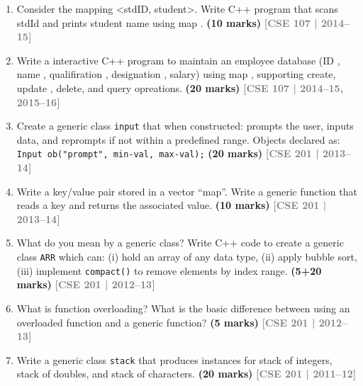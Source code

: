 \documentclass[12pt,a3paper]{article}
\newcommand{\yr}[1]{\hfill\textcolor{gray}{\small\textbf{[#1]}}}
\newcommand{\mk}[1]{\textcolor{orange!70!black}{\small\textbf{(#1 marks)}}}
\begin{document}
\begin{enumerate}
\item Consider the mapping <stdID, student>. Write C++ program that scans stdId and prints student name using map . \mk{10}
\yr{CSE 107 | 2014--15}



\item Write a interactive C++ program to maintain an employee database (ID , name , qualifiration , designation , salary) using map , supporting create, update , delete, and query opreations. \mk{20}
\yr{CSE 107 | 2014--15, 2015--16}




\item Create a generic class \texttt{input} that when constructed: prompts the user, inputs data, and reprompts if not within a predefined range. Objects declared as: \texttt{Input ob("prompt", min-val, max-val);} \mk{20}
\yr{CSE 201 | 2013--14}





\item Write a key/value pair stored in a vector ``map''. Write a generic function that reads a key and returns the associated value. \mk{10}
\yr{CSE 201 | 2013--14}




\item What do you mean by a generic class? Write C++ code to create a generic class \texttt{ARR} which can: (i) hold an array of any data type, (ii) apply bubble sort, (iii) implement \texttt{compact()} to remove elements by index range. \mk{5+20}
\yr{CSE 201 | 2012--13}





\item What is function overloading? What is the basic difference between using an overloaded function and a generic function? \mk{5}
\yr{CSE 201 | 2012--13}




\item Write a generic class \texttt{stack} that produces instances for stack of integers, stack of doubles, and stack of characters. \mk{20}
\yr{CSE 201 | 2011--12}





\end{enumerate}
\end{document}
